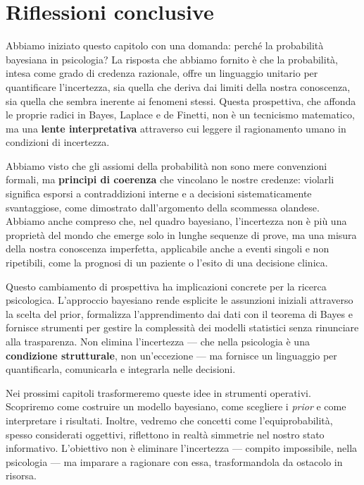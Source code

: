 \documentclass[
  italian,
  letterpaper,
  a4paper,
  11pt,
  open=any]{scrbook}
\theoremstyle{plain}
\theoremstyle{definition}
\theoremstyle{definition}
\theoremstyle{remark}
\begin{document}
\section*{Riflessioni conclusive}\label{riflessioni-conclusive}


Abbiamo iniziato questo capitolo con una domanda: perché la probabilità
bayesiana in psicologia? La risposta che abbiamo fornito è che la
probabilità, intesa come grado di credenza razionale, offre un
linguaggio unitario per quantificare l'incertezza, sia quella che deriva
dai limiti della nostra conoscenza, sia quella che sembra inerente ai
fenomeni stessi. Questa prospettiva, che affonda le proprie radici in
Bayes, Laplace e de Finetti, non è un tecnicismo matematico, ma una
\textbf{lente interpretativa} attraverso cui leggere il ragionamento
umano in condizioni di incertezza.

Abbiamo visto che gli assiomi della probabilità non sono mere
convenzioni formali, ma \textbf{principi di coerenza} che vincolano le
nostre credenze: violarli significa esporsi a contraddizioni interne e a
decisioni sistematicamente svantaggiose, come dimostrato dall'argomento
della scommessa olandese. Abbiamo anche compreso che, nel quadro
bayesiano, l'incertezza non è più una proprietà del mondo che emerge
solo in lunghe sequenze di prove, ma una misura della nostra conoscenza
imperfetta, applicabile anche a eventi singoli e non ripetibili, come la
prognosi di un paziente o l'esito di una decisione clinica.

Questo cambiamento di prospettiva ha implicazioni concrete per la
ricerca psicologica. L'approccio bayesiano rende esplicite le assunzioni
iniziali attraverso la scelta del prior, formalizza l'apprendimento dai
dati con il teorema di Bayes e fornisce strumenti per gestire la
complessità dei modelli statistici senza rinunciare alla trasparenza.
Non elimina l'incertezza --- che nella psicologia è una
\textbf{condizione strutturale}, non un'eccezione --- ma fornisce un
linguaggio per quantificarla, comunicarla e integrarla nelle decisioni.

Nei prossimi capitoli trasformeremo queste idee in strumenti operativi.
Scopriremo come costruire un modello bayesiano, come scegliere i
\emph{prior} e come interpretare i risultati. Inoltre, vedremo che
concetti come l'equiprobabilità, spesso considerati oggettivi,
riflettono in realtà simmetrie nel nostro stato informativo. L'obiettivo
non è eliminare l'incertezza --- compito impossibile, nella psicologia
--- ma imparare a ragionare con essa, trasformandola da ostacolo in
risorsa.
\end{document}
